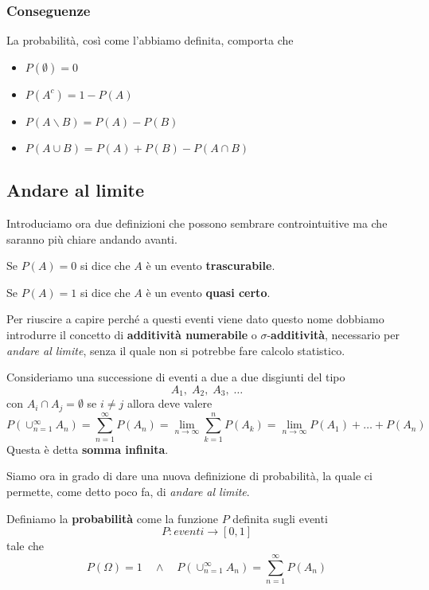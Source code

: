 \subsubsection{Conseguenze}
La probabilità, così come l'abbiamo definita, comporta che
\begin{itemize}
	\item $P(\emptyset) = 0$
	\item $P(A^c) = 1 - P(A)$
	\item $P(A \backslash B) = P(A) - P(B)$
	\item $P(A \cup B) = P(A) + P(B) - P(A \cap B)$
\end{itemize}

\subsection{Andare al limite}
Introduciamo ora due definizioni che possono sembrare controintuitive ma che saranno più chiare andando
avanti.

\begin{definition}
	Se $P(A) = 0$ si dice che $A$ è un evento \textbf{trascurabile}.
\end{definition}

\begin{definition}
	Se $P(A) = 1$ si dice che $A$ è un evento \textbf{quasi certo}.
\end{definition}

Per riuscire a capire perché a questi eventi viene dato questo nome dobbiamo introdurre il concetto di
\textbf{additività numerabile} o $\sigma$-\textbf{additività}, necessario per \emph{andare al limite},
senza il quale non si potrebbe fare calcolo statistico.

\begin{theorem}
	Consideriamo una successione di eventi a due a due disgiunti del tipo
	\[ A_1, \; A_2, \; A_3, \; \dots \]
	con $A_i \cap A_j = \emptyset$ se $i \neq j$ allora deve valere
	\[
		P(\cup_{n=1}^\infty A_n) = \sum_{n=1}^\infty P(A_n) =
		\lim_{n \to \infty} \sum_{k=1}^n P(A_k) = 	\lim_{n \to \infty} P(A_1) + \dots + P(A_n)
	\]
	Questa è detta \textbf{somma infinita}.
\end{theorem}

Siamo ora in grado di dare una nuova definizione di probabilità, la quale ci permette, come detto poco fa,
di \emph{andare al limite}.
\begin{definition}
	Definiamo la \textbf{probabilità} come la funzione $P$ definita sugli eventi
	\[ P : eventi \to [0, 1] \]
	tale che
	\[
		P(\Omega) = 1 \quad \land \quad
		P(\cup_{n=1}^\infty A_n) = \sum_{n=1}^\infty P(A_n)
	\]
\end{definition}

